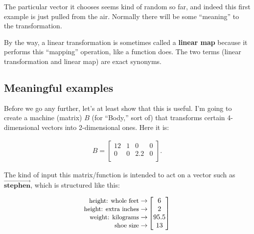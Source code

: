 The particular vector it chooses seems kind of random so far, and indeed this
first example is just pulled from the air. Normally there will be some
``meaning'' to the transformation.


By the way, a linear transformation is sometimes called a \textbf{linear map}
because it performs this ``mapping'' operation, like a function does. The two
terms (linear transformation and linear map) are exact synonyms.

\subsection{Meaningful examples}

Before we go any further, let's at least show that this is useful. I'm going to
create a machine (matrix) $B$ (for ``Body,'' sort of) that transforms certain
4-dimensional vectors into 2-dimensional ones. Here it is:

\vspace{-.15in}
\begin{align*}
B = 
\begin{bmatrix}
12 & 1 & 0 & 0 \\
0 & 0 & 2.2 & 0 \\
\end{bmatrix}.
\end{align*}
\vspace{-.15in}

The kind of input this matrix/function is intended to act on a vector such as
$\overrightarrow{\textbf{stephen}}$, which is structured like this:

\vspace{-.3in} 
\begin{align*}
\begin{matrix*}[r]
\textrm{\small{height: whole feet}} \rightarrow \\
\textrm{\small{height: extra inches}} \rightarrow \\
\textrm{\small{weight: kilograms}} \rightarrow \\
\textrm{\small{shoe size}} \rightarrow \\
\end{matrix*}
\begin{bmatrix}
6 \\ 2 \\ 95.5 \\ 13 \\
\end{bmatrix}
\end{align*}
\vspace{-.15in}

